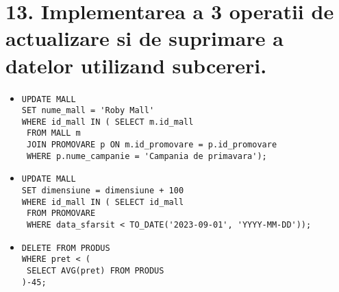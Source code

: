 
\section*{13. Implementarea a 3 operatii de actualizare si de suprimare a datelor utilizand subcereri.}
\vspace{0.5cm}
\begin{itemize}
    \item 
    \begin{lstlisting}
UPDATE MALL
SET nume_mall = 'Roby Mall'
WHERE id_mall IN ( SELECT m.id_mall
 FROM MALL m
 JOIN PROMOVARE p ON m.id_promovare = p.id_promovare
 WHERE p.nume_campanie = 'Campania de primavara');
    \end{lstlisting}
    \vspace{0.5cm}
    \item 
    \begin{lstlisting}
UPDATE MALL
SET dimensiune = dimensiune + 100
WHERE id_mall IN ( SELECT id_mall
 FROM PROMOVARE
 WHERE data_sfarsit < TO_DATE('2023-09-01', 'YYYY-MM-DD'));
    \end{lstlisting}
    \vspace{0.5cm}
    \item 
    \begin{lstlisting}
DELETE FROM PRODUS
WHERE pret < (
 SELECT AVG(pret) FROM PRODUS
)-45;
    \end{lstlisting}
\end{itemize}
